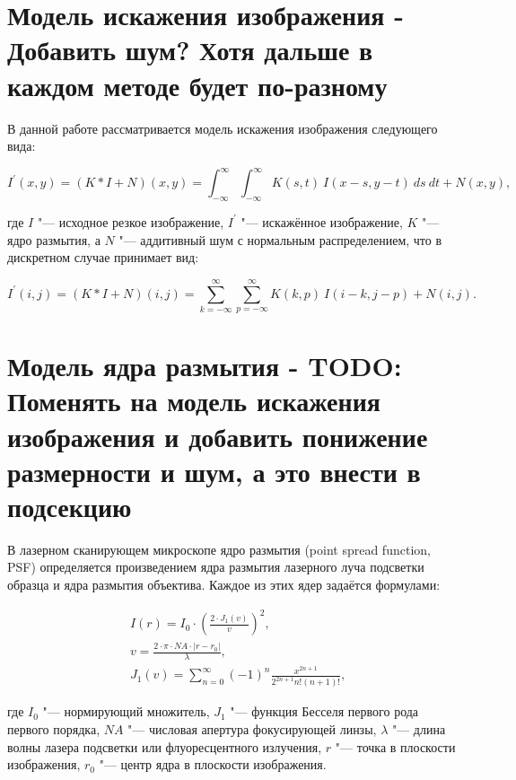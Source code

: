 \section{Модель искажения изображения - Добавить шум? Хотя дальше в каждом методе будет по-разному} \label{sec:image-blur-model}

В данной работе рассматривается модель искажения изображения следующего вида:

\begin{equation*}
	I^\prime \left( x, y \right)=\left(K\ast I+N\right)\left(x,y\right)=\int_{-\infty}^{\infty}\int_{-\infty}^{\infty}{K\left(s,t\right)\ I\left(x-s,y-t\right)\ ds\ dt}+N(x,y),
\end{equation*}

\noindent где $I$ "--- исходное резкое изображение, $I^\prime$ "--- искажённое изображение, $K$ "--- ядро размытия, а $N$ "--- аддитивный шум с нормальным распределением, что в дискретном случае принимает вид:

\begin{equation*}
	I^\prime\left(i,j\right)=\left(K\ast I+N\right)\left(i,j\right)=\sum_{k=-\infty}^{\infty} \sum_{p=-\infty}^{\infty}{K\left(k,p\right)\ I\left(i-k,j-p\right)}+N(i,j).
\end{equation*}

\section{Модель ядра размытия - TODO: Поменять на модель искажения изображения и добавить понижение размерности и шум, а это внести в подсекцию} \label{sec:microscope-psf}

В лазерном сканирующем микроскопе ядро размытия (point spread function, PSF) определяется произведением ядра размытия лазерного луча подсветки образца и ядра размытия объектива. Каждое из этих ядер задаётся формулами:

\begin{align*}
	&I\left(r\right) = I_0 \cdot \left(\frac{2\cdot J_1\left(v\right)}{v}\right)^2, \\
	&v=\frac{2\cdot\pi\cdot N A\cdot\left|r-r_0\right|}{\lambda}, \\
	&J_1(v)=\sum_{n=0}^{\infty}{\left(-1\right)^n\frac{x^{2n+1}}{2^{2n+1}n!\left(n+1\right)!}},
\end{align*}

\noindent где $I_0$ "--- нормирующий множитель, $J_1$ "--- функция Бесселя первого рода первого порядка, $NA$ "--- числовая апертура фокусирующей линзы, $\lambda$ "--- длина волны лазера подсветки или флуоресцентного излучения, $r$ "--- точка в плоскости изображения, $r_0$ "--- центр ядра в плоскости изображения.

